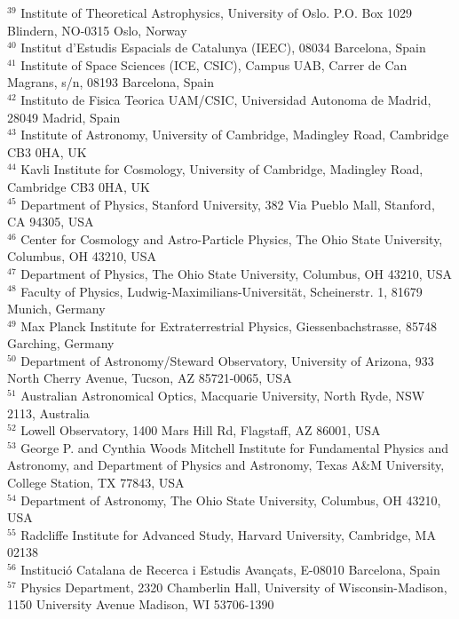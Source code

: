 \documentclass[fleqn,usenatbib]{mnras}
\begin{document}
{$^{39}$ Institute of Theoretical Astrophysics, University of Oslo. P.O. Box 1029 Blindern, NO-0315 Oslo, Norway\\
$^{40}$ Institut d'Estudis Espacials de Catalunya (IEEC), 08034 Barcelona, Spain\\
$^{41}$ Institute of Space Sciences (ICE, CSIC),  Campus UAB, Carrer de Can Magrans, s/n,  08193 Barcelona, Spain\\
$^{42}$ Instituto de Fisica Teorica UAM/CSIC, Universidad Autonoma de Madrid, 28049 Madrid, Spain\\
$^{43}$ Institute of Astronomy, University of Cambridge, Madingley Road, Cambridge CB3 0HA, UK\\
$^{44}$ Kavli Institute for Cosmology, University of Cambridge, Madingley Road, Cambridge CB3 0HA, UK\\
$^{45}$ Department of Physics, Stanford University, 382 Via Pueblo Mall, Stanford, CA 94305, USA\\
$^{46}$ Center for Cosmology and Astro-Particle Physics, The Ohio State University, Columbus, OH 43210, USA\\
$^{47}$ Department of Physics, The Ohio State University, Columbus, OH 43210, USA\\
$^{48}$ Faculty of Physics, Ludwig-Maximilians-Universit\"at, Scheinerstr. 1, 81679 Munich, Germany\\
$^{49}$ Max Planck Institute for Extraterrestrial Physics, Giessenbachstrasse, 85748 Garching, Germany\\
$^{50}$ Department of Astronomy/Steward Observatory, University of Arizona, 933 North Cherry Avenue, Tucson, AZ 85721-0065, USA\\
$^{51}$ Australian Astronomical Optics, Macquarie University, North Ryde, NSW 2113, Australia\\
$^{52}$ Lowell Observatory, 1400 Mars Hill Rd, Flagstaff, AZ 86001, USA\\
$^{53}$ George P. and Cynthia Woods Mitchell Institute for Fundamental Physics and Astronomy, and Department of Physics and Astronomy, Texas A\&M University, College Station, TX 77843,  USA\\
$^{54}$ Department of Astronomy, The Ohio State University, Columbus, OH 43210, USA\\
$^{55}$ Radcliffe Institute for Advanced Study, Harvard University, Cambridge, MA 02138\\
$^{56}$ Instituci\'o Catalana de Recerca i Estudis Avan\c{c}ats, E-08010 Barcelona, Spain\\
$^{57}$ Physics Department, 2320 Chamberlin Hall, University of Wisconsin-Madison, 1150 University Avenue Madison, WI  53706-1390\\
}
\end{document}
